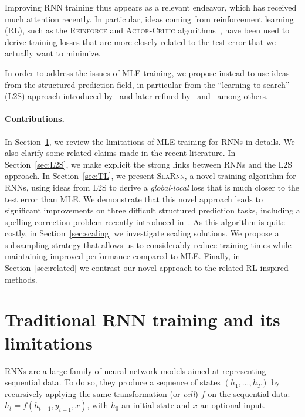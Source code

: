 \documentclass{article}
\newcommand{\SEARNN}{\textsc{SeaRnn}}
\begin{document}
	Improving RNN training thus appears as a relevant endeavor, which has received much attention recently.
	In particular, ideas coming from reinforcement learning (RL), such as the \textsc{Reinforce} and \textsc{Actor-Critic} algorithms~\citep{Ranzato2016b, Bahdanau2016}, have been used to derive training losses that are more closely related to the test error that we actually want to minimize.

	In order to address the issues of MLE training, we propose instead to use ideas from the structured prediction field, in particular from the ``learning to search'' (L2S) approach introduced by~\citet{Daume2009b} and later refined by~\citet{Ross2014c} and~\citet{Chang2015} among others.

	\paragraph{Contributions.}
	In Section~\ref{sec:RNN}, we review the limitations of MLE training for RNNs in details.
	We also clarify some related claims made in the recent literature.
	In Section~\ref{sec:L2S}, we make explicit the strong links between RNNs and the L2S approach.
	In Section~\ref{sec:TL}, we present \SEARNN, a novel training algorithm for RNNs, using ideas from L2S to derive a  \emph{global-local} loss that is much closer to the test error than MLE.
	We demonstrate that this novel approach leads to significant improvements on three difficult structured prediction tasks, including a spelling correction problem recently introduced in~\citet{Bahdanau2016}.
	As this algorithm is quite costly, in Section~\ref{sec:scaling} we investigate scaling solutions.
	We propose a subsampling strategy that allows us to considerably reduce training times while maintaining improved performance compared to MLE.
	Finally, in Section~\ref{sec:related} we contrast our novel approach to the related RL-inspired methods.

	\vspace{-1mm}
	\section{Traditional RNN training and its limitations}\label{sec:RNN}
	\vspace{-1.5mm}
	RNNs are a large family of neural network models aimed at representing sequential data.
	To do so, they produce a sequence of states $(h_1, ..., h_T)$ by recursively applying the same transformation (or \emph{cell}) $f$ on the sequential data: $h_t = f(h_{t-1}, y_{t-1}, x)$, with $h_0$ an initial state and $x$ an optional input.
\end{document}
